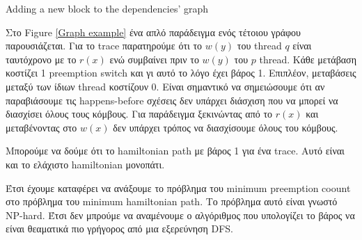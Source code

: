 \begin{algorithm}[H]
    \caption{Adding a new block to the dependencies' graph}
    \label{Adding a new block to the dependencies graph}
\end{algorithm}



Στο Figure \ref{Graph example} ένα απλό παράδειγμα ενός τέτοιου γράφου παρουσιάζεται. Για το trace παρατηρούμε ότι το $w(y)$ του thread 
$q$ είναι ταυτόχρονο με το $r(x)$ ενώ συμβαίνει πριν το $w(y)$ του $p$ thread. Κάθε μετάβαση κοστίζει 1 preemption switch και γι αυτό
το λόγο έχει βάρος 1.
Επιπλέον, μεταβάσεις μεταξύ των ίδιων thread κοστίζουν 0. Είναι σημαντικό να σημειώσουμε ότι αν παραβιάσουμε τις happens-before σχέσεις
δεν υπάρχει διάσχιση που να μπορεί να διασχίσει όλους τους κόμβους. Για παράδειγμα ξεκινώντας από το $r(x)$ και μεταβένοντας στο
$w(x)$ δεν υπάρχει τρόπος να διασχίσουμε όλους του κόμβους.

Μπορούμε να δούμε ότι το hamiltonian path με βάρος 1 για ένα trace. Αυτό είναι και το ελάχιστο hamiltonian μονοπάτι.

Έτσι έχουμε καταφέρει να ανάξουμε το πρόβλημα του minimum preemption coount στο πρόβλημα του minimum hamiltonian path.
Το πρόβλημα αυτό είναι γνωστό  NP-hard. Έτσι δεν μπρούμε να αναμένουμε ο αλγόριθμος που υπολογίζει το βάρος να είναι θεαματικά πιο γρήγορος
από μια εξερεύνηση DFS. 


